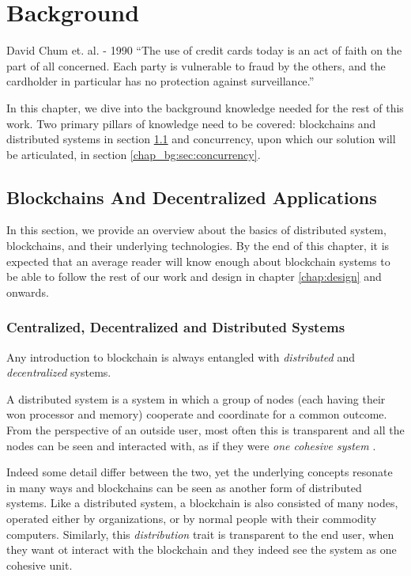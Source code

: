\chapter{Background} \label{chap:background}

\begin{chapquote}{David Chum et. al. - 1990}
``The use of credit cards today is an act of faith on the part of all concerned. Each party is
vulnerable to fraud by the others, and the cardholder in particular has no protection against
surveillance.''
\end{chapquote}


In this chapter, we dive into the background knowledge needed for the rest of this work. Two primary
pillars of knowledge need to be covered: blockchains and distributed systems in section
\ref{chap_bg:sec:blockchains} and concurrency, upon which our solution will be articulated, in
section \ref{chap_bg:sec:concurrency}.

\section{Blockchains And Decentralized Applications} \label{chap_bg:sec:blockchains}

In this section, we provide an overview about the basics of distributed system, blockchains, and
their underlying technologies. By the end of this chapter, it is expected that an average reader
will know enough about blockchain systems to be able to follow the rest of our work and design in
chapter \ref{chap:design} and onwards.

\subsection{Centralized, Decentralized and Distributed Systems}

Any introduction to blockchain is always entangled with \textit{distributed} and
\textit{decentralized} systems.

A distributed system is a system in which a group of nodes (each having their won processor and
memory) cooperate and coordinate for a common outcome. From the perspective of an outside user, most
often this is transparent and all the nodes can be seen and interacted with, as if they were
\textit{one cohesive system} \cite{bashirMASTERINGBLOCKCHAINDistributed2018}.

Indeed some detail differ between the two, yet the underlying concepts resonate in many ways
\cite{herlihyBlockchainsDistributedComputing2019} and blockchains can be seen as another form of
distributed systems. Like a distributed system, a blockchain is also consisted of many nodes,
operated either by organizations, or by normal people with their commodity computers. Similarly,
this \textit{distribution} trait is transparent to the end user, when they want ot interact with the
blockchain and they indeed see the system as one cohesive unit.

